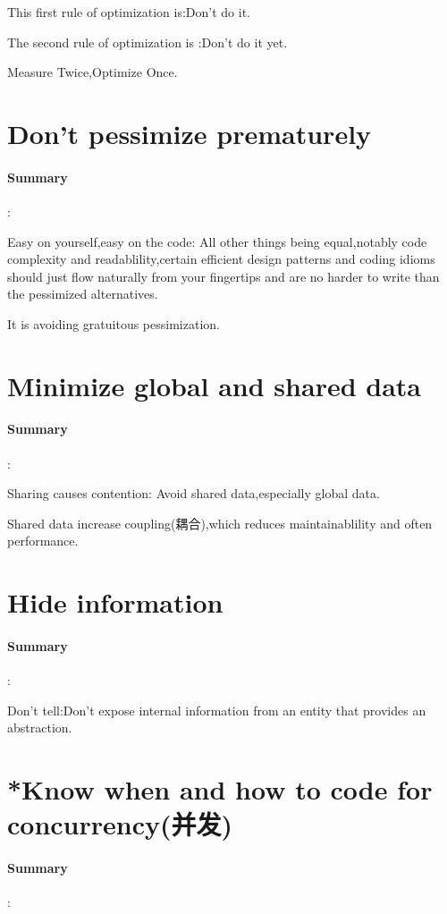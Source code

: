\documentclass[UTF8,a4paper,12pt]{ctexbook}
\begin{document}
			This first rule of optimization is:Don't do it.
			
			The second rule of optimization is :Don't do it yet.
			
			Measure Twice,Optimize Once.
		
	\section{Don't pessimize prematurely}
		\paragraph{Summary}:
			
			Easy on yourself,easy on the code: All other things being equal,notably code complexity and readablility,certain efficient design patterns and coding idioms should just flow naturally from your fingertips and are no harder to write than the pessimized alternatives.
			
			It is avoiding gratuitous pessimization.
		
	\section{Minimize global and shared data}
		\paragraph{Summary}:
		
			Sharing causes contention: Avoid shared data,especially global data.
			
			Shared data increase coupling(耦合),which reduces maintainablility and often performance.
	\section{Hide information}
		\paragraph{Summary}:
		
			Don't tell:Don't expose internal information from an entity that provides an abstraction.
		
	\section{*Know when and how to code for concurrency(并发)}
		\paragraph{Summary}:
		
\end{document}
